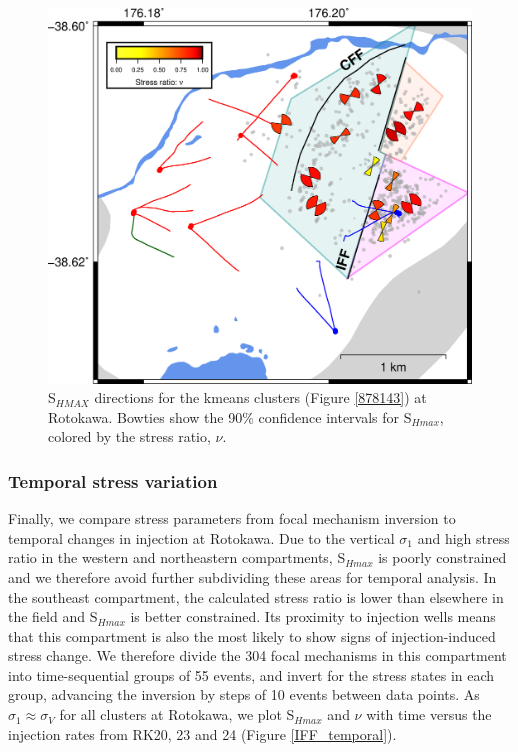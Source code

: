 \begin{figure}[h!]
\begin{center}
\includegraphics[width=0.84\columnwidth]{Chapter_5_FMs/figures/merc_Rot_kmeans_cents_40_sigmas_seis_nu/merc_Rot_dets_kmeans_30_cents_SHmax_nu_comps}
\caption[S$_{Hmax}$ and $\nu$ for kmeans clusters at Rotokawa]{{
S$_{HMAX}$ directions for the kmeans clusters (Figure \ref{878143}) at Rotokawa. Bowties show the 90\% confidence intervals for S$_{Hmax}$, colored by the stress ratio, $\nu$.
{\label{533041}}%
}}
\end{center}
\end{figure}


\subsubsection{Temporal stress variation}
Finally, we compare stress parameters from focal mechanism inversion to temporal changes in injection at Rotokawa. Due to the vertical $\sigma_{1}$ and high stress ratio in the western and northeastern compartments, S$_{Hmax}$ is poorly constrained and we therefore avoid further subdividing these areas for temporal analysis. In the southeast compartment, the calculated stress ratio is lower than elsewhere in the field and S$_{Hmax}$ is better constrained. Its proximity to injection wells means that this compartment is also the most likely to show signs of injection-induced stress change. We therefore divide the 304 focal mechanisms in this compartment into time-sequential groups of 55 events, and invert for the stress states in each group, advancing the inversion by steps of 10 events between data points. As $\sigma_{1}\approx{\sigma_{V}}$ for all clusters at Rotokawa, we plot S$_{Hmax}$ and $\nu$ with time versus the injection rates from RK20, 23 and 24 (Figure \ref{IFF_temporal}). 

